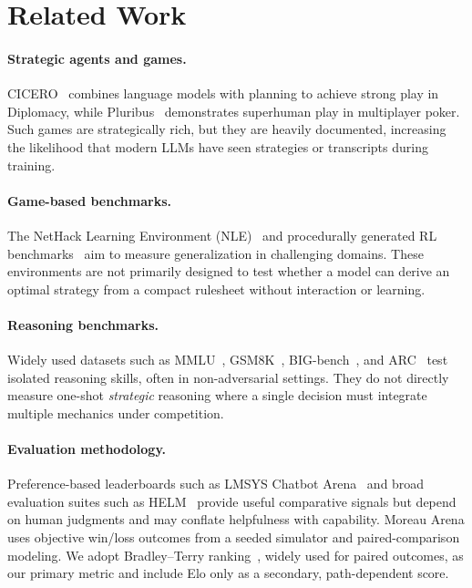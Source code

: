 \documentclass[11pt]{article}
\begin{document}
\section{Related Work}

\paragraph{Strategic agents and games.}
CICERO~\cite{cicero} combines language models with planning to achieve strong play in Diplomacy, while Pluribus~\cite{pluribus} demonstrates superhuman play in multiplayer poker.
Such games are strategically rich, but they are heavily documented, increasing the likelihood that modern LLMs have seen strategies or transcripts during training.

\paragraph{Game-based benchmarks.}
The NetHack Learning Environment (NLE)~\cite{nle} and procedurally generated RL benchmarks~\cite{procgen} aim to measure generalization in challenging domains.
These environments are not primarily designed to test whether a model can derive an optimal strategy from a compact rulesheet without interaction or learning.

\paragraph{Reasoning benchmarks.}
Widely used datasets such as MMLU~\cite{mmlu}, GSM8K~\cite{gsm8k}, BIG-bench~\cite{bigbench}, and ARC~\cite{arc} test isolated reasoning skills, often in non-adversarial settings.
They do not directly measure one-shot \emph{strategic} reasoning where a single decision must integrate multiple mechanics under competition.

\paragraph{Evaluation methodology.}
Preference-based leaderboards such as LMSYS Chatbot Arena~\cite{chatbot_arena} and broad evaluation suites such as HELM~\cite{helm} provide useful comparative signals but depend on human judgments and may conflate helpfulness with capability.
Moreau Arena uses objective win/loss outcomes from a seeded simulator and paired-comparison modeling.
We adopt Bradley--Terry ranking~\cite{bradley_terry}, widely used for paired outcomes, as our primary metric and include Elo only as a secondary, path-dependent score.
\end{document}
